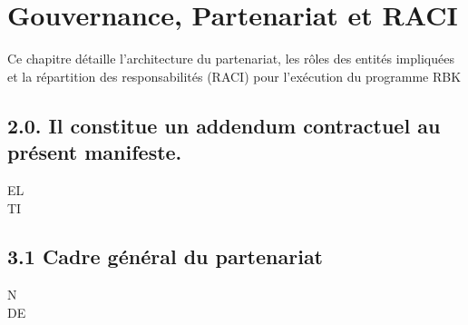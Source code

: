 \documentclass[12pt,landscape,a4paper]{article}
\begin{document}
\section{Gouvernance, Partenariat et RACI}
\vspace{0.5em}
\vspace{0.5em}
Ce chapitre détaille l’architecture du partenariat, les rôles des entités impliquées et la répartition des responsabilités (RACI) pour l’exécution du programme RBK\\
\subsection{2.0. Il constitue un addendum contractuel au présent manifeste.}
\vspace{0.5em}
\vspace{0.5em}
\vspace{0.5em}
\vspace{0.5em}
EL\\
TI\\
\subsection{3.1 Cadre général du partenariat}
\vspace{0.5em}
\vspace{0.5em}
\vspace{0.5em}
\vspace{0.5em}
N\\
DE\\
\end{document}
